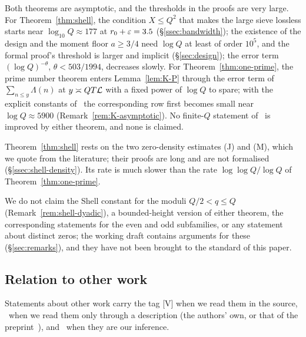 Both theorems are asymptotic, and the thresholds in the proofs are very large. For Theorem~\ref{thm:shell}, the condition $X\le Q^2$ that makes the
large sieve lossless starts near $\log_{10}Q\approx177$ at $r_0+\varepsilon=3.5$ (\S\ref{ssec:bandwidth}); the existence of the design and the moment floor
$a\ge3/4$ need $\log Q$ at least of order $10^5$, and the formal proof's threshold is larger and implicit (\S\ref{sec:design}); the error term
$(\log Q)^{-\theta}$, $\theta<503/1994$, decreases slowly. For Theorem~\ref{thm:one-prime}, the prime number theorem enters Lemma~\ref{lem:K-P}
through the error term of $\sum_{n\le y}\Lambda(n)$ at $y\asymp QT\mathcal L$ with a fixed power of $\log Q$ to spare; with the explicit constants
of~\cite{FKS} the corresponding row first becomes small near $\log Q\approx5900$ (Remark~\ref{rem:K-asymptotic}). No finite-$Q$ statement
of~\cite{DSouza} is improved by either theorem, and none is claimed.

Theorem~\ref{thm:shell} rests on the two zero-density estimates (J) and (M), which we quote from the literature; their proofs are long and are not
formalised (\S\ref{ssec:shell-density}). Its rate is much slower than the rate $\log\log Q/\log Q$ of Theorem~\ref{thm:one-prime}.

We do not claim the Shell constant for the moduli $Q/2<q\le Q$ (Remark~\ref{rem:shell-dyadic}), a bounded-height version of either theorem, the
corresponding statements for the even and odd subfamilies, or any statement about distinct zeros; the working draft contains arguments for these
(\S\ref{sec:remarks}), and they have not been brought to the standard of this paper.

\subsection{Relation to other work}\label{ssec:others}
Statements about other work carry the tag [V] when we read them in the source, \Vsim\ when we read them only through a description (the authors'
own, or that of the preprint~\cite{DSouza}), and \tagM\ when they are our inference.

